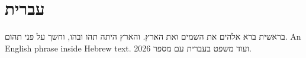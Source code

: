 \documentclass{article}
\begin{document}
\section{עברית}
בראשית ברא אלהים את השמים ואת הארץ. והארץ היתה תהו ובהו, וחשך על פני תהום.
\textenglish{An English phrase inside Hebrew text.} ועוד משפט בעברית עם מספר 2026.
\end{document}
